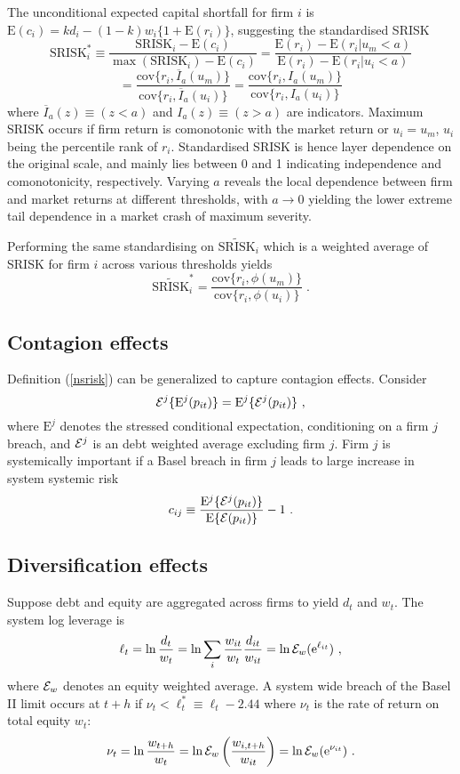 \documentclass[authoryear]{elsarticle}
\newcommand{\E}{\mathrm{E}}
\newcommand{\e}{\mathrm{e}}
\newcommand{\cov}{\mathrm{cov}}
\newcommand{\Ex}{{\cal E}}
\newcommand{\eref}[1]{(\ref{#1})}
\newcommand{\be}[1]{\begin{equation}\label{#1}}
\newcommand{\ee}{\end{equation}}
\begin{document}
The unconditional expected capital shortfall for firm $i$ is $\E(c_i)=kd_i-(1-k)w_i\{1+\E(r_i)\}$, suggesting the standardised SRISK
$$
\mathrm{SRISK}_i^* \equiv \frac{\mathrm{SRISK}_i-\E(c_i)}{\max(\mathrm{SRISK}_i)-\E(c_i)}
=\frac{\E(r_i)-\E(r_i|u_m<a)}{\E(r_i)-\E(r_i|u_i<a)}
$$
$$
=\frac{\cov\{r_i,\overline{I}_a(u_m)\}}{\cov\{r_i,\overline{I}_a(u_i)\}}
=\frac{\cov\{r_i,I_a(u_m)\}}{\cov\{r_i,I_a(u_i)\}} 
$$
where $\overline{I}_a(z)\equiv (z<a)$ and $I_a(z)\equiv (z>a)$ are indicators. Maximum SRISK occurs if firm return is comonotonic with the market return or $u_i=u_m$, $u_i$ being the percentile rank of $r_i$. Standardised SRISK is hence layer dependence on the original scale, and mainly lies between 0 and 1 indicating independence and comonotonicity, respectively. Varying $a$ reveals the local dependence between firm and market returns at different thresholds, with $a\rightarrow 0$ yielding the lower extreme tail dependence in a market crash of maximum severity.

Performing the same standardising on $\widetilde{\mathrm{SRISK}}_i$ which is a weighted average of SRISK for firm $i$ across various thresholds yields
$$
\widetilde{\mathrm{SRISK}}_i^* = \frac{\cov\{r_i,\phi(u_m)\}}{\cov\{r_i,\phi(u_i)\}}   \;.
$$




\subsection{Contagion effects}
Definition \eref{nsrisk} can be generalized to capture contagion effects.  Consider 
\be{cont}
\Ex^j\{\E^j(p_{it})\}=\E^j\{\Ex^j(p_{it})\}\ ,
\ee
where  $\E^j$ denotes the stressed conditional expectation, conditioning on a firm $j$ breach, and $\Ex^j$ is an debt weighted average excluding firm $j$.  Firm $j$ is systemically important  if a Basel breach in firm $j$ leads to large increase in system systemic risk
$$
c_{ij}\equiv \frac{\E^j\{\Ex^j(p_{it})\}}{\E\{\Ex(p_{it})\}}-1\ .
$$

\subsection{Diversification effects} 

Suppose debt and equity are  aggregated across firms to yield $d_t$ and $w_t$.  The system log leverage is  
$$
\ell_t =  \ln \frac{d_t}{w_t} =  \ln \sum_i\frac{w_{it}}{w_t}\frac{ d_{it}}{ w_{it}} = \ln \Ex_w(\e^{\ell_{it}}) \ ,
$$
where $\Ex_w$ denotes an equity weighted average.  A system wide breach of the Basel II limit occurs at $t+h$ if
$
\nu_t < \ell_t^*\equiv \ell_t - 2.44
$
where $\nu_t$ is the rate of return on total equity $w_t$:
\be{ew}
 \nu_t = \ln \frac{w_{t+h}}{w_t} = \ln \Ex_w\left(\frac{w_{i,t+h}}{w_{it}}\right) = \ln \Ex_w(\e^{\nu_{it}})\ . 
\ee
\end{document}
